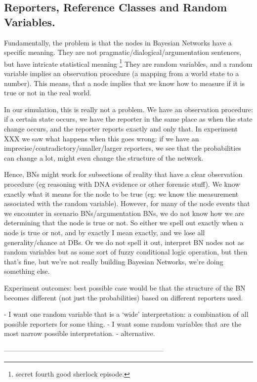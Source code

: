 \subsection{Reporters, Reference Classes and Random Variables.}

Fundamentally, the problem is that the nodes in Bayesian Networks have a specific meaning. They are not pragmatic/dialogical/argumentation sentences, but have intricate statistical meaning \footnote{secret fourth good sherlock episode.} They are random variables, and a random variable implies an observation procedure (a mapping from a world state to a number). This means, that a node implies that we know how to measure if it is true or not in the real world.

 In our simulation, this is really not a problem. We have an observation procedure: if a certain state occurs, we have the reporter in the same place as when the state change occurs, and the reporter reports exactly and only that. In experiment XXX we saw what happens when this goes wrong: if we have an imprecise/contradictory/smaller/larger reporters, we see that the probabilities can change a lot, might even change the structure of the network. 
 
Hence, BNs might work for subsections of reality that have a clear observation procedure (eg reasoning with DNA evidence or other forensic stuff). We know exactly what it means for the node to be true (eg: we know the measurement associated with the random variable). However, for many of the node events that we encounter in scenario BNs/argumentation BNs, we do not know how we are determining that the node is true or not. So either we spell out exactly when a node is true or not, and by exactly I mean exactly, and we lose all generality/chance at DBs. Or we do not spell it out, interpret BN nodes not as random variables but as some sort of fuzzy conditional logic operation, but then that's fine, but we're not really building Bayesian Networks, we're doing something else.

Experiment outcomes: best possible case would be that the structure of the BN becomes different (not just the probabilities) based on different reporters used.

- I want one random variable that is a `wide' interpretation: a combination of all possible reporters for some thing.
- I want some random variables that are the most narrow possible interpretation.
- alternative.

---------------------------------------------------------------------

